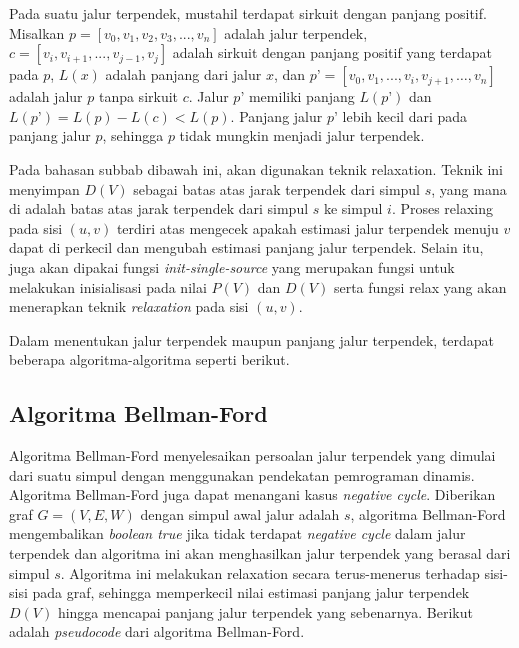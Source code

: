 Pada suatu jalur terpendek, mustahil terdapat sirkuit dengan  panjang positif. Misalkan 
$p = [v_{0}, v_{1}, v_{2}, v_{3}, ..., v_{n}]$ adalah jalur terpendek, 
$c = [v_{i}, v_{i+1}, ..., v_{j-1}, v_{j}]$ adalah sirkuit dengan panjang positif yang 
terdapat pada $p$, $L(x)$ adalah panjang dari jalur $x$, dan 
$p’ = [v_{0}, v_{1}, ..., v_{i}, v_{j+1}, …, v_{n}]$ adalah jalur $p$ tanpa sirkuit $c$. 
Jalur $p’$ memiliki panjang $L(p’)$ dan $L(p’) = L(p) - L(c) < L(p)$. Panjang jalur 
$p’$ lebih kecil dari pada panjang jalur $p$, sehingga $p$ tidak mungkin menjadi jalur 
terpendek.

Pada bahasan subbab dibawah ini, akan digunakan teknik relaxation. Teknik ini menyimpan $D(V)$
sebagai batas atas jarak terpendek dari simpul $s$, yang mana di adalah batas atas jarak terpendek
dari simpul $s$ ke simpul $i$. Proses relaxing pada sisi $(u, v)$ terdiri atas mengecek apakah
estimasi jalur terpendek menuju $v$ dapat di perkecil dan mengubah estimasi panjang jalur terpendek.
Selain itu, juga akan dipakai fungsi \textit{init-single-source} yang merupakan fungsi untuk
melakukan inisialisasi pada nilai $P(V)$ dan $D(V)$ serta fungsi relax yang akan menerapkan teknik
\textit{relaxation} pada sisi $(u,v)$.

\medskip


\medskip


Dalam menentukan jalur terpendek maupun panjang jalur terpendek, terdapat beberapa 
algoritma-algoritma seperti berikut.

  \subsection{Algoritma Bellman-Ford}
  Algoritma Bellman-Ford menyelesaikan persoalan jalur terpendek yang dimulai dari suatu simpul
  dengan menggunakan pendekatan pemrograman dinamis. Algoritma Bellman-Ford juga dapat menangani
  kasus \textit{negative cycle}. Diberikan graf $G = (V, E, W)$ dengan simpul awal jalur adalah $s$,
  algoritma Bellman-Ford mengembalikan \textit{boolean true} jika tidak terdapat \textit{negative
  cycle} dalam jalur terpendek dan algoritma ini akan menghasilkan jalur terpendek yang berasal dari
  simpul $s$. Algoritma ini melakukan \textit{}{relaxation} secara terus-menerus terhadap sisi-sisi
  pada graf, sehingga memperkecil nilai estimasi panjang jalur terpendek $D(V)$ hingga mencapai
  panjang jalur terpendek yang sebenarnya. Berikut adalah \textit{pseudocode} dari algoritma
  Bellman-Ford.

